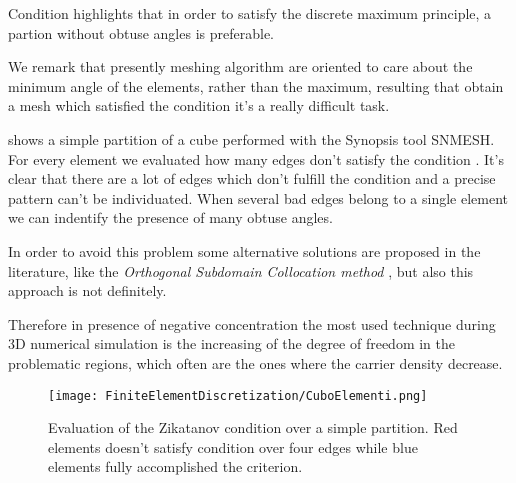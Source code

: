 \begin{Osservazione}
Condition  highlights that in order to satisfy the discrete maximum principle, a partion without obtuse angles is preferable.
\end{Osservazione}

We remark that presently meshing algorithm are oriented to care about the minimum angle of the elements, rather than the maximum, resulting that obtain a mesh which satisfied the condition  it's a really difficult task. 

 shows a simple partition of a cube performed with the Synopsis tool SNMESH. For every element we evaluated how many edges don't satisfy the condition .
It's clear that there are a lot of edges which don't fulfill the condition and a precise pattern can't be individuated. When several bad edges belong to a single element we can indentify the presence of many obtuse angles.

In order to avoid this problem some alternative solutions are proposed in the literature, like the \textit{Orthogonal Subdomain Collocation method} \cite{OSCputticorded}, but also this approach is not definitely. 

Therefore in presence of negative concentration the most used technique during 3D numerical simulation is the increasing of the degree of freedom in the problematic regions, which often are the ones where the carrier density decrease.



\begin{figure}[!b]
\centering
{\texttt{[image: FiniteElementDiscretization/CuboElementi.png]}}
\caption{Evaluation of the Zikatanov condition over a simple partition. Red elements doesn't satisfy condition   over four edges while blue elements fully accomplished the criterion.}
\label{fig: cubo zikatanov}
\end{figure}


